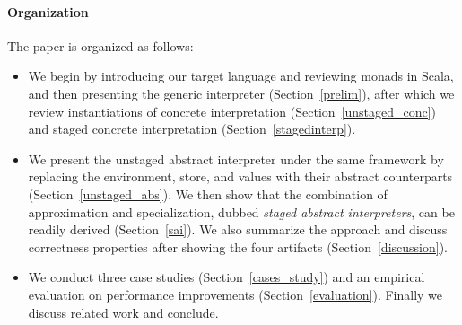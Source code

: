 \paragraph{Organization} The paper is organized as follows:
\begin{itemize}[leftmargin=2em]
  \item We begin by introducing our target language and reviewing
    monads in Scala, and then presenting the generic interpreter
    (Section~\ref{prelim}), after which we review instantiations
    of concrete interpretation (Section~\ref{unstaged_conc}) and
    staged concrete interpretation (Section~\ref{stagedinterp}).
  \item We present the unstaged abstract interpreter under the same
    framework by replacing the environment, store, and values with their
    abstract counterparts (Section~\ref{unstaged_abs}). We then
    show that the combination of approximation and specialization, dubbed
    \textit{staged abstract interpreters}, can be readily derived
    (Section~\ref{sai}). We also summarize the approach and discuss
    correctness properties after showing the four artifacts (Section~\ref{discussion}).
  \item We conduct three case studies (Section~\ref{cases_study}) and an
    empirical evaluation on performance improvements (Section~\ref{evaluation}).  
    Finally we discuss related work and conclude.
\end{itemize}

\iffalse
On the other side, static analysis is a trade-off between performance and
precision: higher precision usually leads to longer running time.

4. Existing method to improve the performance is adhoc, engineering heavy, require to rewrite the optimized version, therefore harder to reason about the correctness
6. program analyzers are also meta-programs, they manipulate other programs as data objects
\fi
